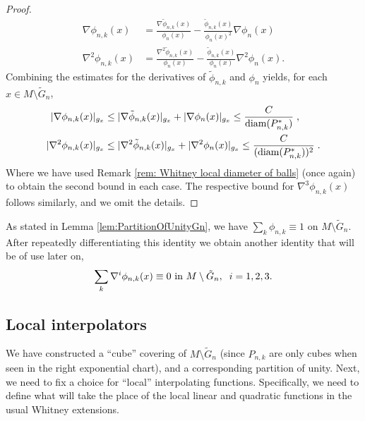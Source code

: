 \documentclass[11pt,reqno]{amsart}
\numberwithin{equation}{section}
\theoremstyle{plain}
\def\diam{\textnormal{diam}}
\begin{document}
\begin{proof}
    \begin{align*}
      \nabla \phi_{n,k}(x) & = \frac{\nabla \tilde \phi_{n,k}(x)}{\phi_n(x)}-\frac{\tilde \phi_{n,k}(x)}{\phi_n(x)^{2}} \nabla \phi_n(x)\\
      \nabla^2 \phi_{n,k}(x) & = \frac{\nabla^2\tilde \phi_{n,k}(x)}{\phi_n(x)}-\frac{\tilde \phi_{n,k}(x)}{\phi_n(x)}\nabla^2\phi_n(x).
    \end{align*}
    Combining the estimates for the derivatives of $\tilde \phi_{n,k}$ and $\phi_n$ yields, for each $x\in M\setminus \tilde G_n$,
    \begin{align*}
      |\nabla \phi_{n,k}(x)|_{g_x} & \leq |\nabla \tilde \phi_{n,k}(x)|_{g_x}+|\nabla \phi_n(x)|_{g_x} \leq  \frac{C}{\diam(P_{n,k}^*)} \;,\\
      |\nabla^2\phi_{n,k}(x)|_{g_x} & \leq |\nabla^2\tilde \phi_{n,k}(x)|_{g_x}+|\nabla^2\phi_n(x)|_{g_x} \leq \frac{C}{(\diam(P_{n,k}^*))^2}\;.
    \end{align*}
    Where we have used Remark \ref{rem: Whitney local diameter of balls} (once again) to obtain the second bound in each case. The respective bound for $\nabla^3\phi_{n,k}(x)$ follows similarly, and we omit the details. 
  	
  \end{proof}
  
  \begin{rem}
    As stated in Lemma \ref{lem:PartitionOfUnityGn}, we have $\sum_k \phi_{n,k}\equiv 1$ on $M \setminus \tilde G_n$. After repeatedly differentiating this identity we obtain another identity that will be of use later on,
    \begin{align}\label{eqFinDim:Partition of Unity Differentiation Identity}
      \sum \limits_{k} \nabla^{i} \phi_{n,k}(x) \equiv 0 \textnormal{ in } M\setminus \tilde G_n,\;\; i=1,2,3.    
    \end{align}
  
  \end{rem}
  
  \subsection{Local interpolators} We have constructed a ``cube'' covering of $M \setminus \tilde G_n$ (since $P_{n,k}$ are only cubes when seen in the right exponential chart), and a corresponding partition of unity. Next, we need to fix a choice for ``local'' interpolating functions.  Specifically, we need to define what will take the place of the local linear and quadratic functions in the usual Whitney extensions.
  
\end{document}
